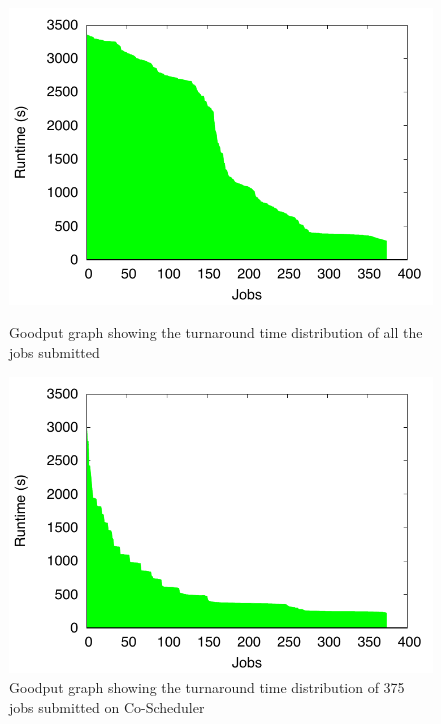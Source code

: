 \documentclass[ms,electronic,double]{nuthesis}
\begin{document}
\begin{figure}[h!]
\begin{center}
\includegraphics{images/tusker_jobgoodput}
\caption{Goodput graph showing the turnaround time distribution of all the jobs submitted}
\label{fig:tusker_jobgoodput}
\end{center}

\begin{center}
\includegraphics{images/coscheduler_jobgoodput}
\caption{Goodput graph showing the turnaround time distribution of 375 jobs submitted on Co-Scheduler}
\label{fig:coscheduler_jobgoodput}
\end{center}

\end{figure}
\FloatBarrier
\end{document}

